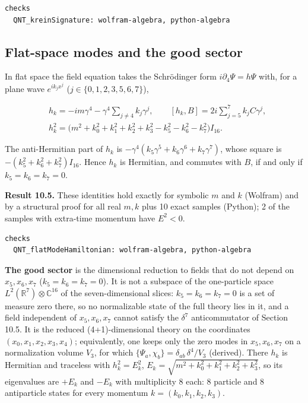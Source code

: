 \documentclass[11pt]{article}
\begin{document}
\begin{Verbatim}[fontsize=\small]
checks
  QNT_kreinSignature: wolfram-algebra, python-algebra
\end{Verbatim}

\subsection{Flat-space modes and the good sector}

In flat space the field equation takes the Schrödinger form $i\partial_4\Psi=h\Psi$ with, for a plane wave $e^{ik_jx^j}$ ($j\in\{0,1,2,3,5,6,7\}$),

\[
\begin{aligned}
&h_k=-im\gamma^4-\gamma^4\sum_{j\ne4}k_j\gamma^j,\qquad [h_k,B]=2i\sum_{j=5}^{7}k_jC\gamma^j,\\
&h_k^2=\bigl(m^2+k_0^2+k_1^2+k_2^2+k_3^2-k_5^2-k_6^2-k_7^2\bigr)I_{16} .
\end{aligned}
\]

The anti-Hermitian part of $h_k$ is $-\gamma^4(k_5\gamma^5+k_6\gamma^6+k_7\gamma^7)$, whose square is $-(k_5^2+k_6^2+k_7^2)I_{16}$. Hence $h_k$ is Hermitian, and commutes with $B$, if and only if $k_5=k_6=k_7=0$.

\textbf{Result 10.5.} These identities hold exactly for symbolic $m$ and $k$ (Wolfram) and by a structural proof for all real $m,k$ plus 10 exact samples (Python); 2 of the samples with extra-time momentum have $E^2<0$.

\begin{Verbatim}[fontsize=\small]
checks
  QNT_flatModeHamiltonian: wolfram-algebra, python-algebra
\end{Verbatim}

\textbf{The good sector} is the dimensional reduction to fields that do not depend on $x_5,x_6,x_7$ ($k_5=k_6=k_7=0$). It is not a subspace of the one-particle space $L^2(\mathbb R^7)\otimes\mathbb C^{16}$ of the seven-dimensional slices: $k_5=k_6=k_7=0$ is a set of measure zero there, so no normalizable state of the full theory lies in it, and a field independent of $x_5,x_6,x_7$ cannot satisfy the $\delta^7$ anticommutator of Section 10.5. It is the reduced (4+1)-dimensional theory on the coordinates $(x_0,x_1,x_2,x_3,x_4)$; equivalently, one keeps only the zero modes in $x_5,x_6,x_7$ on a normalization volume $V_3$, for which $\{\Psi_a,\chi_b\}=\delta_{ab}\,\delta^4/V_3$ (derived). There $h_k$ is Hermitian and traceless with $h_k^2=E_k^2$, $E_k=\sqrt{m^2+k_0^2+k_1^2+k_2^2+k_3^2}$, so its eigenvalues are $+E_k$ and $-E_k$ with multiplicity 8 each: 8 particle and 8 antiparticle states for every momentum $k=(k_0,k_1,k_2,k_3)$.
\end{document}
